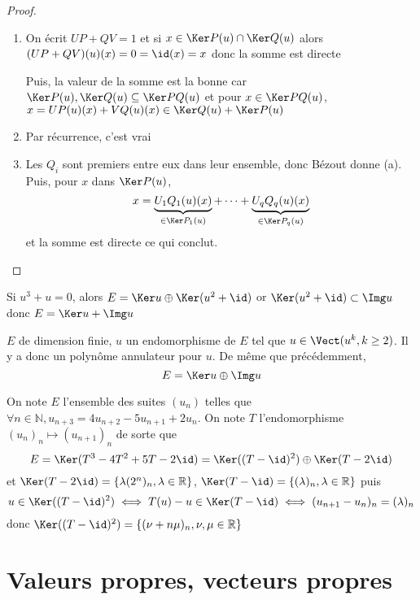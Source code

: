\begin{proof}~
    \begin{enumerate}
        \item On écrit $UP+QV=1$ et si $x\in\Ker P(u)\cap \Ker Q(u)$ alors $(UP+QV)(u)(x)=0=\id(x)=x$ donc la somme est directe

            Puis, la valeur de la somme est la bonne car $\Ker P(u),\Ker Q(u)\subseteq \Ker PQ(u)$ et pour $x\in \Ker PQ(u)$, $x=UP(u)(x)+VQ(u)(x)\in \Ker Q(u)+\Ker P(u)$
        \item Par récurrence, c'est vrai
        \item Les $Q_i$ sont premiers entre eux dans leur ensemble, donc Bézout donne (a). Puis, pour $x$ dans $\Ker P(u)$, \[
                x= \underbrace{U_1Q_1(u)(x)}_{\in\Ker P_1(u)}+\cdots +\underbrace{U_qQ_q(u)(x)}_{\in\Ker P_q(u)}
            \]
            et la somme est directe ce qui conclut.
    \end{enumerate}
\end{proof}

\begin{ex}
    Si $u^3+u=0$, alors $E=\Ker u\oplus \Ker(u^2+\id)$ or $\Ker(u^2+\id)\subset \Img u$ donc $E=\Ker u+\Img u$
\end{ex}

\begin{ex}
    $E$ de dimension finie, $u$ un endomorphisme de $E$ tel que $u\in\Vect(u^k, k\geq 2)$. Il y a donc un polynôme annulateur pour $u$. De même que précédemment, \[
        E=\Ker u\oplus \Img u
    \]
\end{ex}

\begin{ex}
    On note $E$ l'ensemble des suites $(u_n)$ telles que $\forall n\in\mathbb N, u_{n+3}=4u_{n+2}-5u_{n+1}+2u_n$. On note $T$ l'endomorphisme $(u_n)_n\longmapsto (u_{n+1})_n$ de sorte que \[
        E=\Ker(T^3-4T^2+5T-2\id)=\Ker((T-\id)^2)\oplus \Ker(T-2\id)
    \]
    et $\Ker(T-2\id)=\{\lambda (2^n)_n, \lambda\in\mathbb R\}$, $\Ker(T-\id)=\{(\lambda)_n, \lambda\in\mathbb R\}$ puis \[
        u\in \Ker((T-\id)^2)\iff T(u)-u\in\Ker(T-\id)\iff (u_{n+1}-u_n)_n=(\lambda)_n
    \]
    donc $\Ker((T-\id)^2)=\{(\nu+n\mu)_n, \nu, \mu\in\mathbb R\}$
\end{ex}

\section{Valeurs propres, vecteurs propres}

